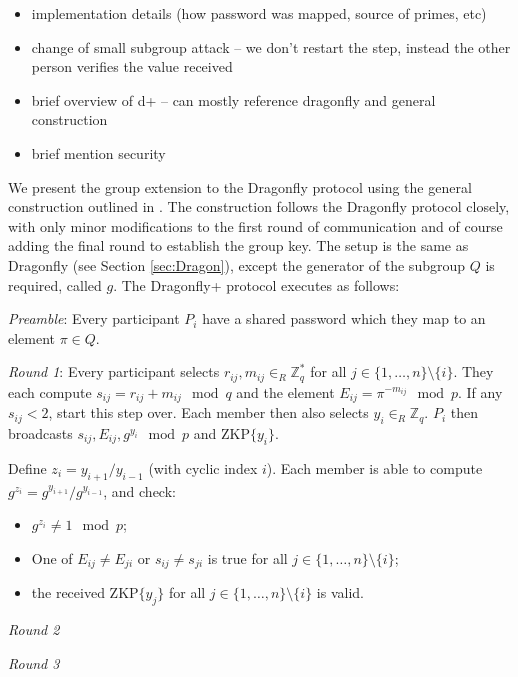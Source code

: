 

\begin{itemize}
    \item implementation details (how password was mapped, source of primes, etc)
    \item change of small subgroup attack -- we don't restart the step, instead the other person verifies the value received
    \item brief overview of d+ -- can mostly reference dragonfly and general construction
    \item brief mention security
\end{itemize}

We present the group extension to the Dragonfly protocol using the general construction outlined in \cite{HaYiChSh15}.
The construction follows the Dragonfly protocol closely, with only minor modifications to the first round of communication
and of course adding the final round to establish the group key. The setup is the same as Dragonfly (see Section \ref{sec:Dragon}),
except the generator of the subgroup $Q$ is required, called $g$. The Dragonfly+ protocol executes as follows:

\emph{Preamble}: Every participant $P_i$ have a shared password which they map to an element $\pi \in Q$.

\emph{Round 1}: Every participant selects $r_{ij}, m_{ij} \in_R \mathbb{Z}_q^*$ for all $j \in \{1,\ldots,n\} \setminus \{i\}$.
They each compute $s_{ij} = r_{ij} + m_{ij} \mod q$ and the element $E_{ij} = \pi^{-m_{ij}} \mod p$. If any $s_{ij} < 2$, start this step over.
Each member then also selects $y_i \in_R \mathbb{Z}_q$. $P_i$ then broadcasts $s_{ij}, E_{ij}, g^{y_i} \mod p$ and $\text{ZKP}\{y_i\}$.

Define $z_i = y_{i+1} / y_{i-1}$ (with cyclic index $i$). Each member is able to compute $g^{z_i} = g^{y_{i+1}} / g^{y_{i-1}}$, and check:
\begin{itemize}
    \item $g^{z_i} \neq 1 \mod p$;
    \item One of $E_{ij} \neq E_{ji}$ or $s_{ij} \neq s_{ji}$ is true for all $j \in \{1,\ldots,n\} \setminus \{i\}$;
    \item the received $\text{ZKP}\{y_j\}$ for all $j \in \{1,\ldots,n\} \setminus \{i\}$ is valid.
\end{itemize}

\emph{Round 2}

\emph{Round 3}
